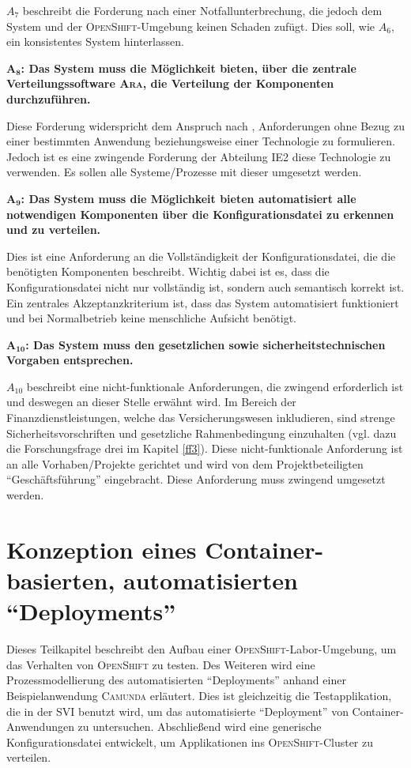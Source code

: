 $A_{7}$ beschreibt die Forderung nach einer Notfallunterbrechung, die jedoch dem System und der \textsc{OpenShift}-Umgebung keinen Schaden zufügt. Dies soll, wie $A_{6}$, ein konsistentes System hinterlassen. 
\par
$\mathbf{A_{8}}$\textbf{: Das System muss die Möglichkeit bieten, über die zentrale Verteilungssoftware \textsc{Ara}, die Verteilung der Komponenten durchzuführen.}
\par
Diese Forderung widerspricht dem Anspruch nach \cite{hull_requirements_2011}, Anforderungen ohne Bezug zu einer bestimmten Anwendung beziehungsweise einer Technologie zu formulieren. Jedoch ist es eine zwingende Forderung der Abteilung \ac{IE2} diese Technologie zu verwenden. Es sollen alle Systeme/Prozesse mit dieser umgesetzt werden.
\par
$\mathbf{A_{9}}$\textbf{: Das System muss die Möglichkeit bieten automatisiert alle notwendigen Komponenten über die Konfigurationsdatei zu erkennen und zu verteilen.}
\par
Dies ist eine Anforderung an die Vollständigkeit der Konfigurationsdatei, die die benötigten Komponenten beschreibt. Wichtig dabei ist es, dass die Konfigurationsdatei nicht nur vollständig ist, sondern auch semantisch korrekt ist. Ein zentrales Akzeptanzkriterium ist, dass das System automatisiert funktioniert und bei Normalbetrieb keine menschliche Aufsicht benötigt.
\par
$\mathbf{A_{10}}$\textbf{: Das System muss den gesetzlichen sowie sicherheitstechnischen Vorgaben entsprechen.}
\par
$A_{10}$ beschreibt eine nicht-funktionale Anforderungen, die zwingend erforderlich ist und deswegen an dieser Stelle erwähnt wird. Im Bereich der Finanzdienstleistungen, welche das Versicherungswesen inkludieren, sind strenge Sicherheitsvorschriften und gesetzliche Rahmenbedingung einzuhalten (vgl. dazu die Forschungsfrage drei im Kapitel \vref{ff3}). Diese nicht-funktionale Anforderung ist an alle Vorhaben/Projekte gerichtet und wird von dem Projektbeteiligten \enquote{Geschäftsführung} eingebracht. Diese Anforderung muss zwingend umgesetzt werden. 

\section{Konzeption eines Container-basierten, automatisierten \enquote{Deployments}}
Dieses Teilkapitel beschreibt den Aufbau einer \textsc{OpenShift}-Labor-Umgebung, um das Verhalten von \textsc{OpenShift} zu testen. Des Weiteren wird eine Prozessmodellierung des automatisierten \enquote{Deployments} anhand einer Beispielanwendung \textsc{Camunda} erläutert. Dies ist gleichzeitig die Testapplikation, die in der \ac{SVI} benutzt wird, um das automatisierte \enquote{Deployment} von Container-Anwendungen zu untersuchen. Abschließend wird eine generische Konfigurationsdatei entwickelt, um Applikationen ins \textsc{OpenShift}-Cluster zu verteilen.

